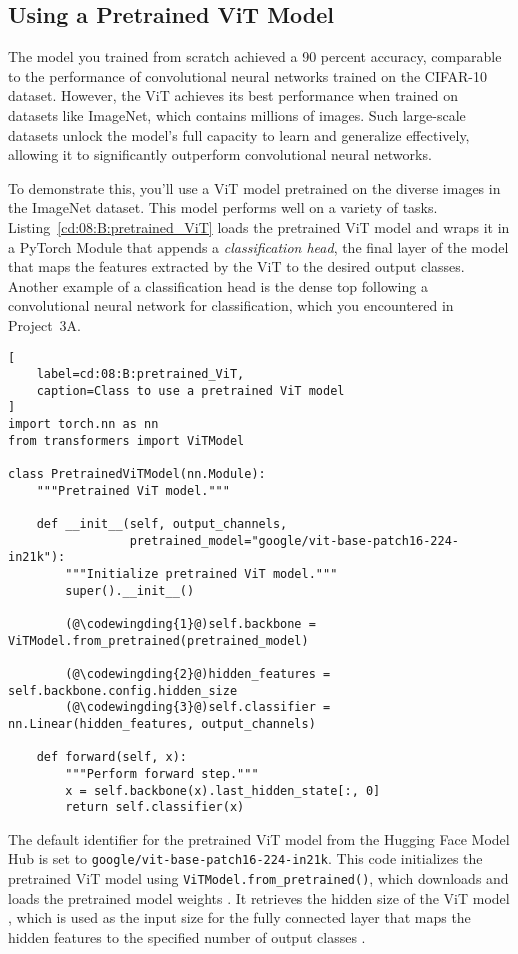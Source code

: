 \subsection{Using a Pretrained ViT Model}

The model you trained from scratch achieved a 90 percent accuracy, comparable to the performance of convolutional neural networks trained on the CIFAR-10 dataset. However, the ViT achieves its best performance when trained on datasets like ImageNet, which contains millions of images. Such large-scale datasets unlock the model's full capacity to learn and generalize effectively, allowing it to significantly outperform convolutional neural networks.

To demonstrate this, you'll use a  ViT model pretrained on the diverse images in the ImageNet dataset. This model performs well on a variety of tasks. Listing~\ref{cd:08:B:pretrained_ViT} loads the pretrained ViT model and wraps it in a PyTorch Module that appends a \emph{classification head}, the final layer of the model that maps the features extracted by the ViT to the desired output classes. Another example of a classification head is the dense top following a convolutional neural network for classification, which you encountered in Project~3A.
\begin{lstlisting}[
    label=cd:08:B:pretrained_ViT,
    caption=Class to use a pretrained ViT model
]
import torch.nn as nn
from transformers import ViTModel

class PretrainedViTModel(nn.Module):
    """Pretrained ViT model."""

    def __init__(self, output_channels,
                 pretrained_model="google/vit-base-patch16-224-in21k"):
        """Initialize pretrained ViT model."""
        super().__init__()

        (@\codewingding{1}@)self.backbone = ViTModel.from_pretrained(pretrained_model)

        (@\codewingding{2}@)hidden_features = self.backbone.config.hidden_size
        (@\codewingding{3}@)self.classifier = nn.Linear(hidden_features, output_channels)

    def forward(self, x):
        """Perform forward step."""
        x = self.backbone(x).last_hidden_state[:, 0]
        return self.classifier(x)
\end{lstlisting}
The default identifier for the pretrained ViT model from the Hugging Face Model Hub is set to \lstinline{google/vit-base-patch16-224-in21k}. This code initializes the pretrained ViT model using \lstinline{ViTModel.from_pretrained()}, which downloads and loads the pretrained model weights . It retrieves the hidden size of the ViT model , which is used as the input size for the fully connected layer that maps the hidden features to the specified number of output classes .

